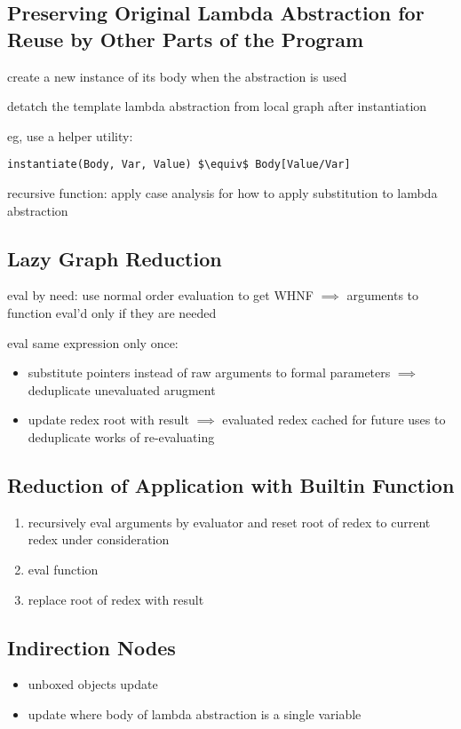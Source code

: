 \documentclass[8pt]{extarticle}
\begin{document}
\begin{multicols*}{2}
\subsection{Preserving Original Lambda Abstraction for Reuse by Other Parts of the Program}
create a new instance of its body when the abstraction is used

detatch the template lambda abstraction from local graph after instantiation

eg, use a helper utility:
\begin{lstlisting}
instantiate(Body, Var, Value) $\equiv$ Body[Value/Var]
\end{lstlisting}

recursive function: apply case analysis for how to apply substitution to lambda abstraction

\subsection{Lazy Graph Reduction}
eval by need: use normal order evaluation to get WHNF $\implies$ arguments to function eval'd only if they are needed

eval same expression only once:
\begin{itemize}
\item substitute pointers instead of raw arguments to formal parameters $\implies$ deduplicate unevaluated arugment
\item update redex root with result $\implies$ evaluated redex cached for future uses to deduplicate works of re-evaluating
\end{itemize}

\subsection{Reduction of Application with Builtin Function}
\begin{enumerate}
\item recursively eval arguments by evaluator and reset root of redex to current redex under consideration
\item eval function
\item replace root of redex with result
\end{enumerate}

\subsection{Indirection Nodes}

\begin{itemize}
\item unboxed objects update
\item update where body of lambda abstraction is a single variable
\end{itemize}


\end{multicols*}
\end{document}
